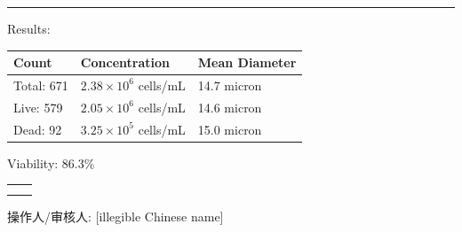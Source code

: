 \documentclass[UTF8,10pt,a4paper,fontset=fandol]{ctexart}
\newcommand{\fieldvalue}[1]{#1}
\newcommand{\handwritten}[1]{#1}
\begin{document}
\begin{center}
\begin{center}
\medskip
\hrule
\medskip

Results:

\medskip

\begin{tabularx}{\textwidth}{@{}lXX@{}}
\textbf{Count} & \textbf{Concentration} & \textbf{Mean Diameter} \\
\hline
Total: %
\fieldvalue{671}
&
\fieldvalue{$2.38\times10^{6}$ cells/mL}
&
\fieldvalue{14.7 micron}
\\
Live: %
\fieldvalue{579}
&
\fieldvalue{$2.05\times10^{6}$ cells/mL}
&
\fieldvalue{14.6 micron}
\\
Dead: %
\fieldvalue{92}
&
\fieldvalue{$3.25\times10^{5}$ cells/mL}
&
\fieldvalue{15.0 micron}
\end{tabularx}

\medskip

Viability: %
\fieldvalue{86.3\%}

\medskip

\begin{center}
\begin{tabular}{cc}
\fbox{\rule{0pt}{0.22\textheight}\rule{0.43\textwidth}{0pt}}
&
\fbox{\rule{0pt}{0.22\textheight}\rule{0.43\textwidth}{0pt}}
\\[1em]
\fbox{\rule{0pt}{0.22\textheight}\rule{0.43\textwidth}{0pt}}
&
\fbox{\rule{0pt}{0.22\textheight}\rule{0.43\textwidth}{0pt}}
\end{tabular}
\end{center}

\medskip

操作人/审核人: %
\fieldvalue{\handwritten{[illegible Chinese name]}}


\end{center}
\end{center}
\end{document}

